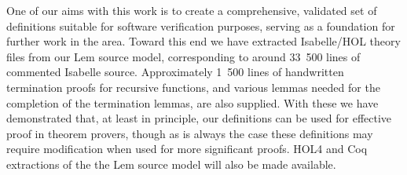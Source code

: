 One of our aims with this work is to create a comprehensive, validated set of definitions suitable for software verification purposes, serving as a foundation for further work in the area.
Toward this end we have extracted Isabelle/HOL theory files from our Lem source model, corresponding to around 33~500 lines of commented Isabelle source.
Approximately 1~500 lines of handwritten termination proofs for recursive functions, and various lemmas needed for the completion of the termination lemmas, are also supplied.
With these we have demonstrated that, at least in principle, our definitions can be used for effective proof in theorem provers, though as is always the case these definitions may require modification when used for more significant proofs.
HOL4 and Coq extractions of the the Lem source model will also be made available.
